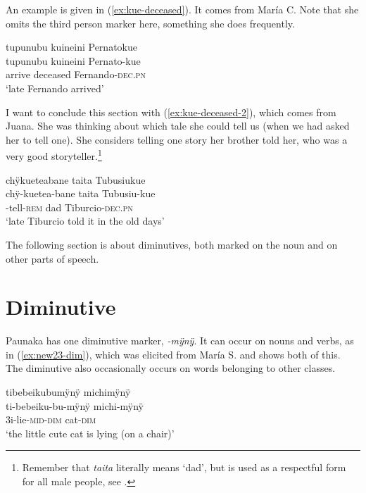 An example is given in (\ref{ex:kue-deceased}). It comes from María C. Note that she omits the third person marker here, something she does frequently.

\ea\label{ex:kue-deceased}
\begingl 
\glpreamble tupunubu kuineini Pernatokue\\
\gla tupunubu kuineini Pernato-kue\\ 
\glb arrive deceased Fernando-\textsc{dec.pn}\\ 
\glft ‘late Fernando arrived’
\trailingcitation{[ump-p110815sf.412]}
\xe

I want to conclude this section with (\ref{ex:kue-deceased-2}), which comes from Juana. She was thinking about which tale she could tell us (when we had asked her to tell one). She considers telling one story her brother told her, who was a very good storyteller.\footnote{Remember that \textit{taita} literally means ‘dad’, but is used as a respectful form for all male people, see .}

\ea\label{ex:kue-deceased-2}
\begingl
\glpreamble chÿkueteabane taita Tubusiukue\\
\gla chÿ-kuetea-bane taita Tubusiu-kue\\
-tell-\textsc{rem} dad Tiburcio-\textsc{dec.pn}\\
\glft ‘late Tiburcio told it in the old days’
\endgl
\trailingcitation{[jmx-n120429ls-x5.038]}
\xe
{}

The following section is about diminutives, both marked on the noun and on other parts of speech.




\section{Diminutive}\label{sec:Diminutives}

Paunaka has one diminutive marker, \textit{-mÿnÿ}. It can occur on nouns and verbs, as in (\ref{ex:new23-dim}), which was elicited from María S. and shows both of this. The diminutive also occasionally occurs on words belonging to other classes. 

\ea\label{ex:new23-dim}
\begingl
\glpreamble tibebeikubumÿnÿ michimÿnÿ\\
\gla ti-bebeiku-bu-mÿnÿ michi-mÿnÿ\\
\glb 3i-lie-\textsc{mid}-\textsc{dim} cat-\textsc{dim}\\
\glft ‘the little cute cat is lying (on a chair)’
\endgl
\trailingcitation{[rxx-e181024l.066]}
\xe

